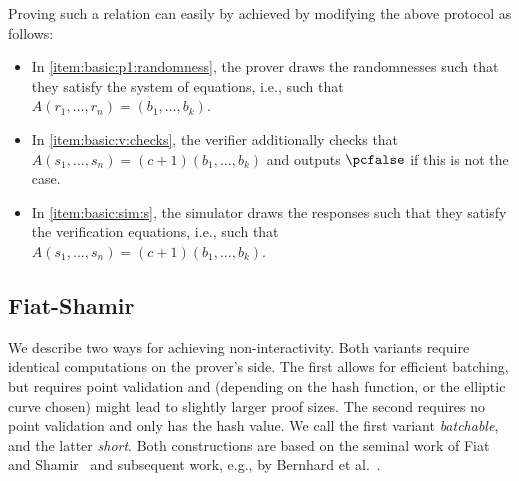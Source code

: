 \documentclass[runningheads,11pt]{article}
\begin{document}
Proving such a relation can easily by achieved by modifying the above protocol as follows:
\begin{itemize}
  \item
    In \cref{item:basic:p1:randomness}, the prover draws the randomnesses such that they satisfy the system of equations, i.e., such that $A(r_1,\dots,r_n)=(b_1,\dots,b_k)$.
  \item
    In \cref{item:basic:v:checks}, the verifier additionally checks that $A(s_1,\dots,s_n)=(c+1)(b_1,\dots,b_k)$ and outputs $\reject$ if this is not the case.
  \item
    In \cref{item:basic:sim:s}, the simulator draws the responses such that they satisfy the verification equations, i.e., such that $A(s_1,\dots,s_n)=(c+1)(b_1,\dots,b_k)$.
\end{itemize}



\subsection{Fiat-Shamir}
We describe two ways for achieving non-interactivity. Both variants require identical computations on the prover's side.
The first allows for efficient batching, but requires point validation and (depending on the hash function, or the elliptic curve chosen) might lead to
slightly larger proof sizes. The second requires no point validation and only has the hash value.
We call the first variant \emph{batchable}, and the latter \emph{short}.
Both constructions are based on the seminal work of Fiat and Shamir~\cite{C:FiaSha86} and subsequent work, e.g., by Bernhard et al.~\cite{AC:BerPerWar12}.
\end{document}
